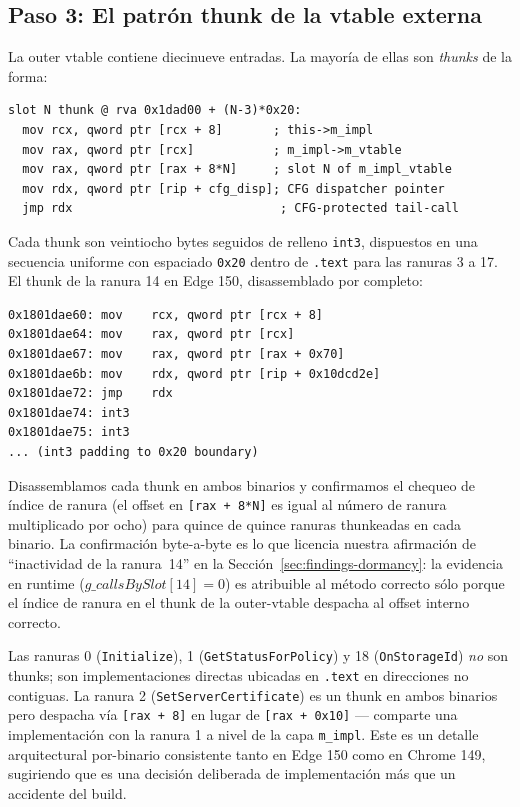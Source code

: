 \documentclass[11pt,letterpaper]{article}
\begin{document}
\subsection{Paso 3: El patrón thunk de la vtable externa}
\label{sec:static-thunk}

La outer vtable contiene diecinueve entradas. La mayoría de ellas
son \emph{thunks} de la forma:

\begin{lstlisting}[basicstyle=\ttfamily\scriptsize]
slot N thunk @ rva 0x1dad00 + (N-3)*0x20:
  mov rcx, qword ptr [rcx + 8]       ; this->m_impl
  mov rax, qword ptr [rcx]           ; m_impl->m_vtable
  mov rax, qword ptr [rax + 8*N]     ; slot N of m_impl_vtable
  mov rdx, qword ptr [rip + cfg_disp]; CFG dispatcher pointer
  jmp rdx                             ; CFG-protected tail-call
\end{lstlisting}

Cada thunk son veintiocho bytes seguidos de relleno
\texttt{int3}, dispuestos en una secuencia uniforme con
espaciado \texttt{0x20} dentro de \texttt{.text} para las ranuras
3 a 17. El thunk de la ranura 14 en Edge 150, disassemblado por
completo:

\begin{lstlisting}[basicstyle=\ttfamily\scriptsize]
0x1801dae60: mov    rcx, qword ptr [rcx + 8]
0x1801dae64: mov    rax, qword ptr [rcx]
0x1801dae67: mov    rax, qword ptr [rax + 0x70]
0x1801dae6b: mov    rdx, qword ptr [rip + 0x10dcd2e]
0x1801dae72: jmp    rdx
0x1801dae74: int3
0x1801dae75: int3
... (int3 padding to 0x20 boundary)
\end{lstlisting}

Disassemblamos cada thunk en ambos binarios y confirmamos el
chequeo de índice de ranura (el offset en \texttt{[rax + 8*N]}
es igual al número de ranura multiplicado por ocho) para quince
de quince ranuras thunkeadas en cada binario. La confirmación
byte-a-byte es lo que licencia nuestra afirmación de
``inactividad de la ranura~14'' en la
Sección~\ref{sec:findings-dormancy}: la evidencia en runtime
($g\_callsBySlot[14] = 0$) es atribuible al método correcto sólo
porque el índice de ranura en el thunk de la outer-vtable
despacha al offset interno correcto.

Las ranuras 0 (\texttt{Initialize}), 1 (\texttt{GetStatusForPolicy})
y 18 (\texttt{OnStorageId}) \emph{no} son thunks; son
implementaciones directas ubicadas en \texttt{.text} en
direcciones no contiguas. La ranura 2
(\texttt{SetServerCertificate}) es un thunk en ambos binarios
pero despacha vía \texttt{[rax + 8]} en lugar de
\texttt{[rax + 0x10]} --- comparte una implementación con la
ranura 1 a nivel de la capa \texttt{m\_impl}. Este es un detalle
arquitectural por-binario consistente tanto en Edge 150 como en
Chrome 149, sugiriendo que es una decisión deliberada de
implementación más que un accidente del build.
\end{document}
